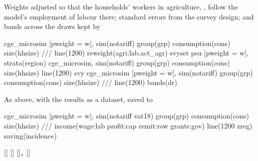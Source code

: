 Weights adjusted so that the households' workers in agriculture, ,
follow the model's employment of labour there; standard errors from the
survey design; and bands across the draws kept by 
\begin{stcode}
cge_microsim [pweight = w], sim(notariff) group(grp) consumption(cons) size(hhsize) ///
    line(1200) reweight(agri:lab.act_agr)
svyset psu [pweight = w], strata(region)
cge_microsim, sim(notariff) group(grp) consumption(cons) size(hhsize) line(1200) svy
cge_microsim [pweight = w], sim(notariff) group(grp) consumption(cons) size(hhsize) ///
    line(1200) bands(dr)
\end{stcode}
As above, with the results as a dataset, saved to 
\begin{stcode}
cge_microsim [pweight = w], sim(notariff vat18) group(grp) consumption(cons) size(hhsize) ///
    income(wage:lab profit:cap remit:row grants:gov) line(1200 zreg) saving(incidence)
\end{stcode}


\begin{stsyntax}
 [] [] []\texttt{,}
  
[]
\end{stsyntax}

